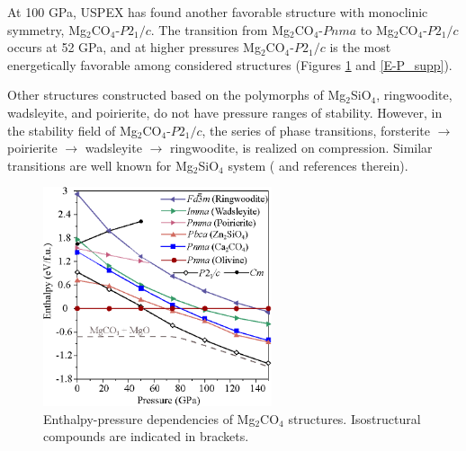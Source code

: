 \documentclass[a4paperm]{article}
\begin{document}
At 100 GPa, USPEX has found another favorable structure with monoclinic symmetry, Mg$_2$CO$_4$-$P2_1/c$.
The transition from Mg$_2$CO$_4$-$Pnma$ to Mg$_2$CO$_4$-$P2_1/c$ occurs at 52 GPa, and at higher pressures Mg$_2$CO$_4$-$P2_1/c$ is the most energetically favorable among considered structures (Figures \ref{E-P} and \ref{E-P_supp}). 

Other structures constructed based on the polymorphs of Mg$_2$SiO$_4$, ringwoodite, wadsleyite, and poirierite, do not have pressure ranges of stability.
However, in the stability field of Mg$_2$CO$_4$-$P2_1/c$, the series of phase transitions, forsterite $\to$ poirierite $\to$ wadsleyite $\to$ ringwoodite, is realized on compression.
Similar transitions are well known for Mg$_2$SiO$_4$ system (\cite{dorogokupets2015} and references therein).



\begin{figure}[H]
	\includegraphics[width=0.6\textwidth]{E-P_mg2co4} \centering
	\caption{Enthalpy-pressure dependencies of Mg$_2$CO$_4$ structures. Isostructural compounds are indicated in brackets.
} \label{E-P}
\end{figure} 
\end{document}
